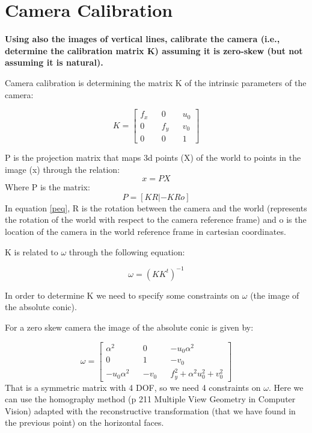 \documentclass[11pt, oneside]{article}   	%
\begin{document}
\section{Camera Calibration} \label{seccalib}
\textbf{Using also the images of vertical lines, calibrate the camera (i.e., determine the calibration matrix K) assuming it is zero-skew (but not assuming it is natural).} \hfill \break

Camera calibration is determining the matrix K of the intrinsic parameters of the camera:

\begin{equation} \label{keq}
K =
\begin{bmatrix}
f_x  && 0 && u_0 \\ 0 && f_y && v_0 \\ 0 && 0 && 1
\end{bmatrix}
\end{equation}

P is the projection matrix that maps 3d points (X) of the world to points in the image (x) through the relation:
\begin{equation} \label{peq1}
x = P X
\end{equation}
Where P is the matrix:
\begin{equation} \label{peq}
P=[KR | -KRo]
\end{equation}
In equation \ref{peq}, R is the rotation between the camera and the world (represents the rotation of the world with respect to the camera reference frame) and o is the location of the camera in the world reference frame in cartesian coordinates.

K is related to $\omega$ through the following equation:

$$
\omega = (KK^t)^{-1}
$$

In order to determine K we need to specify some constraints on $\omega$ (the image of the absolute conic).

For a zero skew camera the image of the absolute conic is given by:

\begin{equation} \label{omegaeq}
\omega = 
\begin{bmatrix}
\alpha^2 && 0 && -u_0 \alpha^2 \\ 0 && 1 && -v_0 \\  -u_0 \alpha^2 && -v_0 && f_y^2 +\alpha^2 u_0^2 + v_0^2
\end{bmatrix}
\end{equation}
That is a symmetric matrix with 4 DOF, so we need 4 constraints on $\omega$.
Here we can use the homography method (p 211 Multiple View Geometry in Computer Vision) adapted with the reconstructive transformation (that we have found in the previous point) on the horizontal faces.
\end{document}
